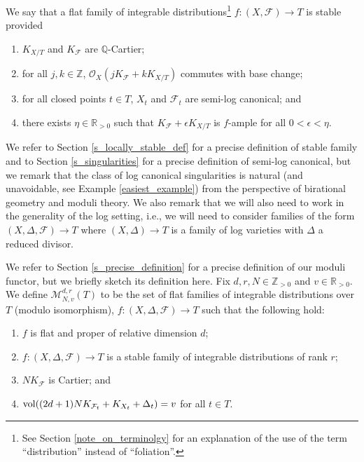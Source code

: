 \documentclass[12pt, a4paper]{amsart}
\theoremstyle{definition}
\theoremstyle{named}
\begin{document}
We say that a flat family of integrable distributions\footnote[1]{See Section \ref{note_on_terminolgy} for an explanation of the use of the term ``distribution'' instead of ``foliation''.}
$f\colon (X, \mathcal F) \rightarrow T$
is stable 
provided 
\begin{enumerate}
    \item 
\label{intro_cond_Qfactorial}
    $K_{X/T}$ and $K_{\mathcal F}$
are $\mathbb Q$-Cartier; 

\item
\label{intro_cond_kollar_condition}
for all $j, k \in \mathbb Z$, $\mathcal O_X(jK_{\mathcal F}+kK_{X/T})$ commutes with base change;

\item 
\label{intro_cond_slc}
for all closed points $t \in T$, $X_t$ and $\mathcal F_t$
are semi-log canonical; and 
\item  
\label{intro_cond_polarization}
there exists $\eta \in \mathbb R_{>0}$ such that $K_{\mathcal F}+\epsilon K_{X/T}$ is $f$-ample for all $0<\epsilon<\eta$.
\end{enumerate} 



We refer to Section \ref{s_locally_stable_def} for a precise definition of stable family and to Section \ref{s_singularities} for a precise definition of semi-log canonical, but we remark that the class of log canonical singularities is natural (and unavoidable, see Example \ref{easiest_example}) from the perspective of birational geometry and moduli theory.
We also remark that we will also need to work in the generality of the log setting, i.e., we will need to consider families of the form $(X, \Delta, \mathcal F) \rightarrow T$ where 
$(X, \Delta) \rightarrow T$ is a family of log varieties with $\Delta$
a reduced divisor.



We refer to Section \ref{s_precise_definition} for a precise definition of our moduli functor, but we briefly sketch its definition here.
Fix $d, r, N \in \mathbb Z_{>0}$ and $v \in \mathbb R_{>0}$.
We define $\mathcal M^{d, r}_{N, v}(T)$ to be the set of flat families of
integrable distributions over $T$ (modulo isomorphism), $f\colon (X, \Delta, \mathcal F) \rightarrow T$
such that the following hold:

  \begin{enumerate}[label=(\roman*)]
    \item
    \label{cond_bla}
    $f$ is flat and proper of relative dimension $d$;


\item $f\colon (X, \Delta, \mathcal F) \rightarrow T$ is a stable family of integrable distributions of rank $r$;



    \item $NK_{\mathcal F}$ is Cartier; and 

    \item ${\rm vol}((2d+1)NK_{\mathcal F_t}+K_{X_t}+\Delta_t
    ) = v$ for all $t \in T$.



\end{enumerate}
\end{document}
